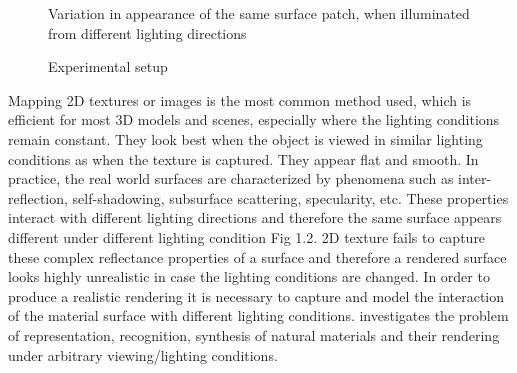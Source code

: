 \begin{figure}[hp]
\centering
{}
\label{fig:3dtexture} 
\caption{Variation in appearance of the same surface
patch, when illuminated from different lighting directions}
\label{fig:setup}
\caption{Experimental setup}
\end{figure}

Mapping 2D textures or images is the most common method used, which is
efficient for most 3D models and scenes, especially where the lighting
conditions remain constant. They look best when the object is viewed in similar lighting conditions as
when the texture is captured. They appear flat and smooth.
In practice, the real world surfaces are
characterized by phenomena such as inter-reflection, self-shadowing, subsurface
scattering, specularity, etc. These properties interact with different lighting
directions and therefore the same surface appears different under
different lighting condition Fig 1.2. 2D texture fails to capture these complex reflectance properties of a 
surface and therefore a rendered surface looks highly unrealistic in case the lighting
conditions are changed. In order to produce a realistic rendering it is necessary to capture
and model the interaction of the material surface with different lighting
conditions. \cite{C1} investigates the problem of representation, recognition, synthesis of
natural materials and their rendering under arbitrary viewing/lighting conditions.

